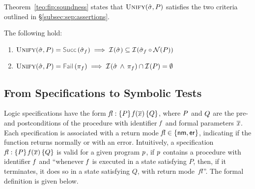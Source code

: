 

Theorem~\ref{teo:fip:soundness} states that $\textsc{Unify}(\hat{\sigma}, P)$ satisfies the two criteria 
outlined in \S\ref{subsec:sep:assertions}.

\begin{theorem}\label{teo:fip:soundness} 
The following hold: 
\begin{enumerate}%
\setlength{\itemsep}{0.1cm}
\item $\unificationfun(\sstate, \pass) = \success{\sstate_f}
        \implies 
        \interpret{}{}(\sstate) \subseteq \interpret{}{}(\sstate_f \statecompose \normaliser(\pass))$
 \item  $\unificationfun(\sstate, \pass) = \fail{\pc_f} 
   \implies
   \interpret{}{}(\sstate \, \wedge \, \pc_f) \cap \interpret{}{}(\pass) = \emptyset$
\end{enumerate}
\end{theorem}


\subsection{From Specifications to Symbolic Tests}\label{specs:to:symbolic:tests}

\jsil Logic specifications have the form ${\mathit{fl}} : \{ P \} \, \mathit{f}(\overline{x}) \, \{ Q \}$, where $P$ and $Q$ are the 
pre- and postconditions of the procedure with identifier $\mathit{f}$ and formal parameters $\overline{x}$. 
Each specification is associated with a return mode $\mathit{fl} \in \{ {\sf nm}, {\sf er} \}$, indicating if the function
 returns normally or with an error. 
 Intuitively, a specification ${\mathit{fl}} : \{ P \} \, \mathit{f}(\overline{x}) \, \{ Q \}$ is 
valid for a given \jsil program $p$, if $p$ contains a procedure with identifier 
$\mathit{f}$ and ``whenever $\mathit{f}$ is executed in a state satisfying $P$, then, 
if it terminates, it does so in a state satisfying $Q$, with return mode~$\mathit{fl}$''.
The formal definition is given below. 


